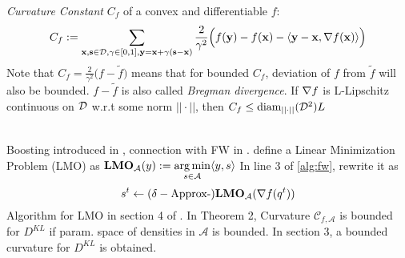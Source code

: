 \documentclass[summaries.tex]{subfiles}
\begin{document}
\emph{Curvature Constant} $C_f$ of a convex and differentiable $f$:
\begin{equation*}
  C_f := \sum\limits_{\mathbf{x}, \mathbf{s} \in \mathcal{D}, \gamma \in [0, 1], \mathbf{y} = \mathbf{x} + 
    \gamma(\mathbf{s} - \mathbf{x})} \frac{2}{\gamma^2}\Big(f(\mathbf{y}) - f(\mathbf{x}) - 
  \langle \mathbf{y} - \mathbf{x}, \nabla f(\mathbf{x}) \rangle \Big)
\end{equation*}
Note that $C_f = \frac{2}{\gamma^2}\Big(f - \tilde{f}\Big)$ means that for bounded
$C_f$, deviation of $f$ from $\tilde{f}$ will also be bounded. $f - \tilde{f}$
is also called \emph{Bregman divergence}. If $\nabla f$ is L-Lipschitz continuous
on $\mathcal{D}$ w.r.t some norm $||\cdot||$, then $C_f \leq 
\text{diam}_{||\cdot||}(\mathcal{D}^2)L$

\\
\INPROGRESS
Boosting introduced in \cite{guo2016boosting}, connection with FW in \cite{locatello2017boosting}.
define a Linear Minimization Problem (LMO) as
$
\mathbf{LMO}_{\mathcal{A}}(y) := \operatorname*{arg\,min}\limits_{s \in \mathcal{A}} \langle y, s \rangle
$
In line 3 of \ref{alg:fw}, rewrite it as
$$
s^t \gets (\delta-\text{Approx-})\mathbf{LMO}_{\mathcal{A}}(\nabla f(q^t))
$$
Algorithm for LMO in section 4 of \cite{locatello2018boosting}. In Theorem 2,
Curvature $\mathcal{C}_{f,\mathcal{A}}$ is bounded for $D^{KL}$ if param. space of
densities in $\mathcal{A}$ is bounded. In section 3, a bounded curvature for
$D^{KL}$ is obtained.
\end{document}
